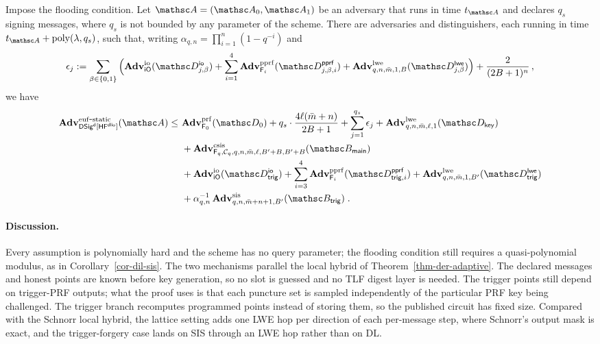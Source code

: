 \begin{theorem} \label{thm-dil-der}
Impose the flooding condition. Let $\advA = (\advA_0, \advA_1)$ be an adversary that runs in time $t_{\advA}$ and declares $q_s$ signing messages, where $q_s$ is not bounded by any parameter of the scheme. There are adversaries and distinguishers, each running in time $t_{\advA} + \poly(\secp, q_s)$, such that, writing $\alpha_{q,n} = \prod_{i=1}^{n}(1-q^{-i})$ and
$$
\epsilon_j
:=
\sum_{\beta\in\{0,1\}}
\Big(
\AdvIO{\iO}{\advD^{\mathsf{io}}_{j,\beta}}
+\sum_{i=1}^{4}\AdvPPRF{\PRF_i}{\advD^{\mathsf{pprf}}_{j,\beta,i}}
+\AdvLWE{q,n,\colsA,1,B}{\advD^{\mathsf{lwe}}_{j,\beta}}
\Big)
+\frac{2}{(2B+1)^{n}} \, ,
$$
we have
$$
\begin{aligned}
\AdvEUFSTATIC{\DSScheme^{\mathsf{d}}[\HF^{\mathsf{dlio}}]}{\advA}
\le\ &\AdvPRF{\PRF_0}{\advD_0}
+ q_s \cdot \frac{4\ell(\colsA+n)}{2B+1}
+ \sum_{j=1}^{q_s}\epsilon_j
+ \AdvLWE{q,n,\colsA,\ell,1}{\advD_{\mathsf{key}}} \\
&+ \AdvCSIS{\Fq_q,\chal_q,q,n,\colsA,\ell,\Bclip+B,\Bclip+B}{\advB_{\mathsf{main}}} \\
&+ \AdvIO{\iO}{\advD^{\mathsf{io}}_{\mathsf{trig}}}
+ \sum_{i=3}^{4}\AdvPPRF{\PRF_i}{\advD^{\mathsf{pprf}}_{\mathsf{trig},i}}
+ \AdvLWE{q,n,\colsA,1,\Bclip}{\advD^{\mathsf{lwe}}_{\mathsf{trig}}} \\
&+ \alpha_{q,n}^{-1}\,\AdvSIS{q,n,\colsA+n+1,\Bclip}{\advB_{\mathsf{trig}}} \;.
\end{aligned}
$$
\end{theorem}

\paragraph*{Discussion.} Every assumption is polynomially hard and the scheme has no query parameter; the flooding condition still requires a quasi-polynomial modulus, as in Corollary~\ref{cor-dil-sis}. The two mechanisms parallel the local hybrid of Theorem~\ref{thm-der-adaptive}. The declared messages and honest points are known before key generation, so no slot is guessed and no TLF digest layer is needed. The trigger points still depend on trigger-PRF outputs; what the proof uses is that each puncture set is sampled independently of the particular PRF key being challenged. The trigger branch recomputes programmed points instead of storing them, so the published circuit has fixed size. Compared with the Schnorr local hybrid, the lattice setting adds one LWE hop per direction of each per-message step, where Schnorr's output mask is exact, and the trigger-forgery case lands on SIS through an LWE hop rather than on DL.

